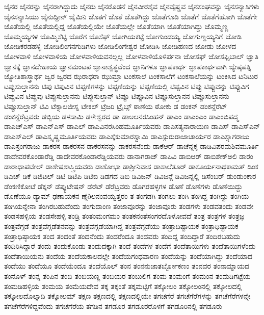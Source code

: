 {ಜೈನರ
ಜೈನರನ್ನು
ಜೈನರಾಗಿದ್ದುದು
ಜೈನರು
ಜೈನರೊಡನೆ
ಜೈನವೀರಶೈವ
ಜೈನವೈಷ್ಣವ
ಜೈನಸಂಘವನ್ನು
ಜೈನಸನ್ಯಾಸಿಗಳು
ಜೈನಸನ್ಯಾಸಿಯು
ಜೈನುದ್ದೀನ್
ಜೈಮಿನಿ
ಜೊತಗೆ
ಜೊತೆ
ಜೊತೆಗಿದ್ದು
ಜೊತೆಗೂಡಿ
ಜೊತೆಗೆ
ಜೊತೆಗೆಹೋಗಿ
ಜೊತೆಗೇ
ಜೊತೆಯಲ್ಲಿ
ಜೊತೆಯಲ್ಲಿದ್ದ
ಜೊತೆಯಲ್ಲಿಯೇ
ಜೊತೆಯಲ್ಲೇ
ಜೊತೆಯಾಗಿ
ಜೊತೆಯಾಗಿದ್ದು
ಜೊಮ್ಮಣ್ಣ
ಜೊಮ್ಮಯ್ಯಗಳ
ಜೊಮ್ಮಿಸೆಟ್ಟಿ
ಜೊರೆಗ
ಜೊಸೆಫ್
ಜೋಗಿಯಕಟ್ಟೆ
ಜೋಗುಂಡಯ್ಯ
ಜೋಗುಣ್ಡಯ್ಯನಿಗೆ
ಜೋಡಿ
ಜೋಡಿಕರಡಹಳ್ಳಿ
ಜೋಡಿಲಿಂಗನಗುಡಿಗಳು
ಜೋಡಿಲಿಂಗೇಶ್ವರ
ಜೋಡಿಸಿ
ಜೋಡಿಹಣದ
ಜೋಡು
ಜೋಳದ
ಜೋಳವಾಳಿ
ಜೋಳವಾಳಿಯ
ಜೋಳವಾಳಿಯವನಲ್ಲಲ್ಲ
ಜೋಳವಾಳಿಯೊಳಿರ್ಪನಾ
ಜೋಸೆಫ್
ಜೋಸೆಫ್ಸಿಬಾಲ್
ಜ್ಞಾತಿ
ಜ್ಞಾನಕ್ಕೆ
ಜ್ಞಾನದೇಹಾಯ
ಜ್ಞಾನಮಂಟಪ
ಜ್ಞಾನಾಶ್ವತ್ಥವೆಂದ
ಜ್ಞಾನಿಗಳೂ
ಜ್ಞಾಪಕಾರ್ಥ
ಜ್ಞಾಪಕಾರ್ಥವಾಗಿ
ಜ್ಯೇಷ್ಠಪತ್ನಿ
ಜ್ಯೋತಿಶಾಸ್ತ್ರಾರ್ಥ
ಜ್ವರ
ಜ್ವರದ
ಝರಾಧರಾ
ಝುಮ್ರಾ
ಟಂಕಸಾಲೆ
ಟಂಕಸಾಲೆಗೆ
ಟಂಕಸಾಲೆಯನ್ನು
ಟಂಕಿಸಿದ
ಟನಿಟುರ
ಟಪ್ಪುಸುಲ್ತಾನನು
ಟಿಪು
ಟಿಪುವಿನ
ಟಿಪ್ಪಣಿಗಳನ್ನು
ಟಿಪ್ಪಣಿಯನ್ನು
ಟಿಪ್ಪಣಿಯಲ್ಲಿ
ಟಿಪ್ಪವಿನ
ಟಿಪ್ಪು
ಟಿಪ್ಪುವನ್ನು
ಟಿಪ್ಪುವಿಗ
ಟಿಪ್ಪುವಿನ
ಟಿಪ್ಪುವು
ಟಿಪ್ಪುಸುಲ್ತಾನನು
ಟಿಪ್ಪುಸುಲ್ತಾನ್
ಟಿಪ್ಪೂ
ಟಿಪ್ಪೂವಿನ
ಟಿಪ್ಪೂಸುಲ್ತಾನನ
ಟಿಪ್ಪೂಸುಲ್ತಾನನು
ಟಿಪ್ಪೂಸುಲ್ತಾನ್
ಟಿವಿ
ಟೆಕ್ನಾಲಜೀಸ್ನ
ಟೇಕಲ್
ಟ್ರೆಜರಿ
ಟ್ರೈಬ್ಸ್
ಠಾಣೆಯ
ಠೋಕು
ಡ
ಡಂಕನ್
ಡಂಕನ್ಡೆರೆಟ್
ಡಂಕನ್ಡೆರೆಟ್ರವರು
ಡಬ್ಬಿಯ
ಡಳಸಾಮಿ
ಡಳೇಶ್ವರದ
ಡಾ
ಡಾಅಲನರಸಿಂಹನ್
ಡಾಎಂ
ಡಾಎಂಎಂ
ಡಾಎಂಬಿಪದ್ಮ
ಡಾಎಚ್ಎಸ್
ಡಾಎನ್ಎಸ್
ಡಾಎಲ್
ಡಾಎವಿನರಸಿಂಹಮೂರ್ತಿಯವರು
ಡಾಎಸತ್ಯನಾರಾಯಣ
ಡಾಎಸ್
ಡಾಎಸ್ಎನ್
ಡಾಎಸ್ಎಲ್
ಡಾಎಸ್ಕೃಷ್ಣಮೂರ್ತಿಯವರು
ಡಾಎಸ್ಕೆಕುಮಾರಸ್ವಾಮಿ
ಡಾಎಸ್ಗುರುರಾಜಾಚಾರ್ಯರ
ಡಾಎಸ್ನಾಗರಾಜು
ಡಾಎಸ್ರಂಗರಾಜು
ಡಾಕರಸ
ಡಾಕರಸನ
ಡಾಕರಸನನ್ನು
ಡಾಕರಸನೆಂದು
ಡಾಕೆಆರ್
ಡಾಚೆನ್ನಕ್ಕ
ಡಾಡಿವಿಪರಮಶಿವಮೂರ್ತಿ
ಡಾದೇವರಕೊಂಡಾರೆಡ್ಡಿ
ಡಾದೇವರಕೊಂಡಾರೆಡ್ಡಿಯವರು
ಡಾನಾಗರಾಜ್
ಡಾಪಿವಿ
ಡಾಬಿಆರ್
ಡಾಬಿಶೇಕ್ಅಲಿ
ಡಾರಂ
ಡಾರಾಧಾಪಟೇಲ್
ಡಾಶೇಷಶಾಸ್ತ್ರಿಯವರು
ಡಾಶೋಭಾ
ಡಾಶ್ರೀನಿವಾಸ
ಡಾಸಾಲೆತೂರ್
ಡಾಸೂರ್ಯನಾಥಕಾಮತ್
ಡಿಂಕ
ಡಿಎಚ್
ಡಿಕೆ
ಡಿಜಿಟಲ್
ಡಿಟಿ
ಡಿಟಿಪಿ
ಡಿಟಿಬಿ
ಡಿಡಗದ
ಡಿಬಿ
ಡಿವಿಜನ್
ಡಿವಿಜನ್ಗೆ
ಡಿವಿಜನ್ನಲ್ಲಿ
ಡಿಸೆಂಬರ್
ಡುಂಡುಂಕಾರ
ಡೆಂಕಣಿಕೋಟೆ
ಡೆಕ್ಕನ್
ಡೆಪ್ಯುಟೇಷನ್
ಡೆರೆಟ್
ಡೆರೆಟ್ರವರು
ಡೊಗರಹಳ್ಳಗಳ
ಡೊಣೆ
ಡೊಣೆಗಳು
ಡೊಣೆಯಿದ್ದು
ಡೊಣೆಯೂ
ಡ್ಯಾಮ್
ಢಣಾಯಕನ
ಣ್ನೆðಲನಂವಯ್ವತ್ತರಂ
ತ
ತಂಗಡಗಿ
ತಂಗಲು
ತಂಗಿ
ತಂಗಿದ್ದ
ತಂಗಿದ್ದು
ತಂಗಿಯ
ತಂಗಿಯನ್ನೇನಾ
ತಂಗಿರಬಹುದೆಂದು
ತಂಗುದಾಂಣ
ತಂಜಾವೂರನ್ನು
ತಂಜಾವೂರು
ತಂಡಗಳು
ತಂಡವತಂದು
ತಂಡವೇ
ತಂಡಸಹಳ್ಳಿಯ
ತಂಡಸೇಹಳ್ಳಿ
ತಂಡ್ರಿ
ತಂತಂಮಂಗಮಂ
ತಂತಕನಂತೆಸಂಗರದೊಳೋವದೆ
ತಂತ್ರ
ತಂತ್ರಗಳ
ತಂತ್ರಜ್ಞ
ತಂತ್ರವೆಗ್ಗಡೆ
ತಂತ್ರವೆಗ್ಗಡೆತನವನ್ನು
ತಂತ್ರವೆಗ್ಗಡೆಯಾಗಿದ್ದ
ತಂತ್ರವೆಗ್ಗಡೆಯು
ತಂತ್ರಾದಿಷ್ಟಾಯಕ
ತಂತ್ರಾಧಿಷ್ಟಾಯಕ
ತಂತ್ರಾಧಿಷ್ಠಾಯಕ
ತಂದ
ತಂದಂತೆ
ತಂದನೆಂದು
ತಂದರೆಂದೂ
ತಂದವರು
ತಂದಿದ್ದ
ತಂದಿದ್ದಾರೆ
ತಂದಿರಬಹುದು
ತಂದಿರಿಸಿದ್ದಾರೆ
ತಂದು
ತಂದುಕೊಂಡು
ತಂದುದಕ್ಕಾಗಿ
ತಂದೆ
ತಂದೆಗಳ
ತಂದೆಗೆ
ತಂದೆತಾಯಿಗಳು
ತಂದೆತಾಯಿಗಳೆಂದು
ತಂದೆತಾಯಿಯನು
ತಂದೆಯ
ತಂದೆಯಕಾಲದಲ್ಲೇ
ತಂದೆಯಗಂಧವಾರಣ
ತಂದೆಯನ್ನು
ತಂದೆಯಾಗಿದ್ದು
ತಂದೆಯಾದ
ತಂದೆಯು
ತಂದೆಯೂ
ತಂದೆಯೆಂದೂ
ತಂದೆಯೊಲ್
ತಂನ
ತಂನನುಜಾತರ್ಬ್ಬೋಕಣಂ
ತಂನವರ
ತಂನಾಮ್ನಾಯದ
ತಂನೊಳ್
ತಂನ್ನ
ತಂಪಿನ
ತಂಬಿ
ತಂಬಿಯಣ್ಣ
ತಂಬಿಯರ
ತಂಬುಲಿಗ
ತಂಮ
ತಂಮಂಗೆ
ತಂಮಂನ
ತಂಮಡಿಗಟ್ಟೆಯ
ತಂಮಡಿಹಳ್ಳಿಯ
ತಂಮಯ
ತಂಮೆಯದೇವ
ತಕ್ಕ
ತಕ್ಕಂತೆ
ತಕ್ಕಮಟ್ಟಿಗೆ
ತಕ್ಕೋಲಂ
ತಕ್ಕೋಲಂನಲ್ಲಿ
ತಕ್ಕೋಲದಲ್ಲಿ
ತಕ್ಕೋಲದೊಲ್ಕಾದಿ
ತಕ್ಕೋಲಮ್
ತಕ್ಷಣ
ತಕ್ಷಣದಲ್ಲಿ
ತಕ್ಷಣದಲ್ಲಿಯೇ
ತಗಚಗೆರೆ
ತಗಚೆಗೆರೆಗಳನ್ನು
ತಗಚೆಗೆರೆಗಳನ್ನೇ
ತಗಚೆಗೆರೆಗಳಿದ್ದವೆಂದು
ತಗಚೆಗೆರೆಯ
ತಗಡಿನ
ತಗಡೂರ
ತಗಡೂರರೊಳಗೆ
ತಗಡೂರಿನಲ್ಲಿ
ತಗಡೂರು
}
